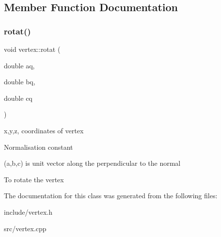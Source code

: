 \subsection{Member Function Documentation}
\mbox{\label{classvertex_aeee1d0d1d69a140a20e7dd2cd214e616}} 
\subsubsection{\texorpdfstring{rotat()}{rotat()}}
{\footnotesize\ttfamily void vertex\+::rotat (\begin{DoxyParamCaption}\item[{double}]{aq,  }\item[{double}]{bq,  }\item[{double}]{cq }\end{DoxyParamCaption})}



x,y,z, coordinates of vertex 

Normalisation constant

(a,b,c) is unit vector along the perpendicular to the normal

To rotate the vertex 

The documentation for this class was generated from the following files\+:\begin{DoxyCompactItemize}
\item 
include/vertex.\+h\item 
src/vertex.\+cpp\end{DoxyCompactItemize}
